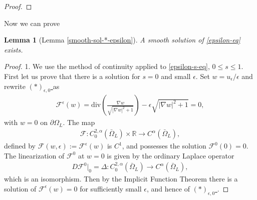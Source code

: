 \documentclass[11pt, letterpaper]{amsart}
\newtheorem{lem}[thm]{Lemma}
\theoremstyle{definition}
\theoremstyle{remark}
\begin{document}
\begin{appendix}
\begin{proof}
\end{proof}

Now we can prove
\begin{lem}[Lemma \ref{smooth-sol-*-epsilon}]\label{appen-smooth-sol-*-epsilon}
	A smooth solution of \ref{epsilon-eq} exists.
\end{lem}
\begin{proof}
	1. We use the method of continuity applied to \ref{epsilon-s-eq}, $0\leq s \leq 1$. First let us prove that there is a solution for $s=0$ and small $\epsilon $. Set $w = u_{\epsilon } / \epsilon $ and rewrite \hyperref[epsilon-s-eq]{$(*)_{\epsilon ,0}$ } as
	\begin{align*}
		\mathcal{F}^{\epsilon }(w) = \mathrm{div}\left( \frac{\nabla w}{\sqrt{|\nabla w|^2 + 1} } \right) - \epsilon \sqrt{|\nabla w|^2 + 1} =0,
	\end{align*} 
	with $w = 0$ on $\partial \Omega _{L}$. The map 
	\begin{align*}
		\mathcal{F}: C^{2, \alpha }_{0}(\bar{\Omega }_{L}) \times \mathbb{R} \to C^{\alpha }(\bar{\Omega }_{L}),
	\end{align*} 
	defined by $\mathcal{F}(w, \epsilon ) := \mathcal{F}^{\epsilon }(w)$ is $C^1$, and possesses the solution $\mathcal{F} ^{0}(0) = 0$. The linearization of $\mathcal{F} ^{0}$ at $w=0$ is given by the ordinary Laplace operator
	\begin{align*}
		D \mathcal{F}^{0}|_{0} = \Delta : C^{2, \alpha }_{0}(\bar{\Omega }_{L}) \to C^{\alpha }(\bar{\Omega }_{L}),
	\end{align*} 
	which is an isomorphism. Then by the Implicit Function Theorem there is a solution of $\mathcal{F}^{\epsilon }(w) =0$ for sufficiently small $\epsilon $, and hence of \hyperref[epsilon-s-eq]{$(*)_{\epsilon ,0}$ }.


\end{proof}
\end{appendix}
\end{document}
